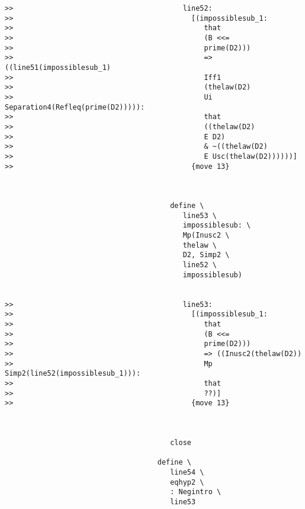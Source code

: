 \documentclass[12pt]{article}
\begin{document}
\begin{verbatim}
>>                                        line52:
>>                                          [(impossiblesub_1:
>>                                             that
>>                                             (B <<=
>>                                             prime(D2)))
>>                                             => ((line51(impossiblesub_1)
>>                                             Iff1
>>                                             (thelaw(D2)
>>                                             Ui Separation4(Refleq(prime(D2))))):
>>                                             that
>>                                             ((thelaw(D2)
>>                                             E D2)
>>                                             & ~((thelaw(D2)
>>                                             E Usc(thelaw(D2))))))]
>>                                          {move 13}



                                       define \
                                          line53 \
                                          impossiblesub: \
                                          Mp(Inusc2 \
                                          thelaw \
                                          D2, Simp2 \
                                          line52 \
                                          impossiblesub)


>>                                        line53:
>>                                          [(impossiblesub_1:
>>                                             that
>>                                             (B <<=
>>                                             prime(D2)))
>>                                             => ((Inusc2(thelaw(D2))
>>                                             Mp Simp2(line52(impossiblesub_1))):
>>                                             that
>>                                             ??)]
>>                                          {move 13}



                                       close

                                    define \
                                       line54 \
                                       eqhyp2 \
                                       : Negintro \
                                       line53



\end{verbatim}
\end{document}
